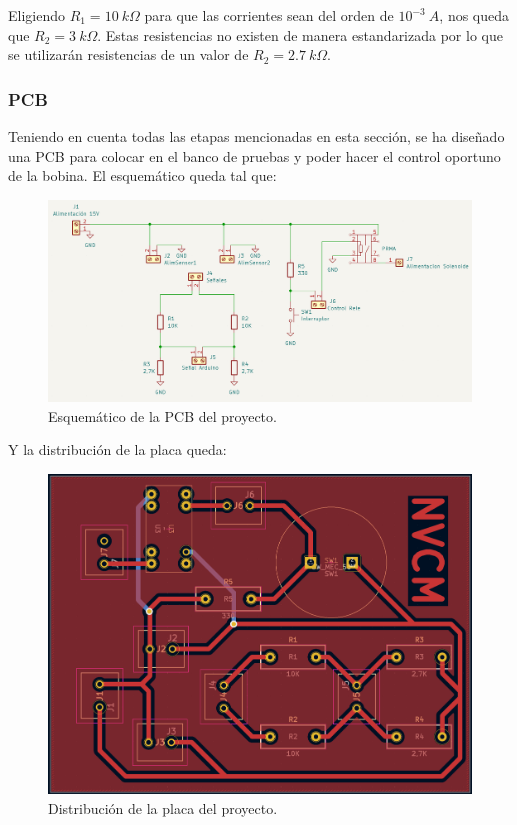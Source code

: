 Eligiendo \(R_1=10~k\Omega\) para que las corrientes sean del orden de \(10^{-3}~A\), nos queda que \(R_2=3~k\Omega\). Estas resistencias no existen de manera estandarizada por lo que se utilizarán resistencias de un valor de \(R_2=2.7~k\Omega\).

\newpage
\subsubsection*{PCB}

Teniendo en cuenta todas las etapas mencionadas en esta sección, se ha diseñado una PCB para colocar en el banco de pruebas y poder hacer el control oportuno de la bobina. El esquemático queda tal que:

\begin{figure}[H]
    \centering
    \includegraphics[width=\linewidth]{FigurasMemoria/esquematicoPCB.png}
    \caption{Esquemático de la PCB del proyecto.}
    \label{fig:esquematicoPCB} %
\end{figure}

\noindent Y la distribución de la placa queda:

\begin{figure}[H]
    \centering
    \includegraphics[width=12.5cm]{FigurasMemoria/placaPCB.png}
    \caption{Distribución de la placa del proyecto.}
    \label{fig:placaPCB} %
\end{figure}

